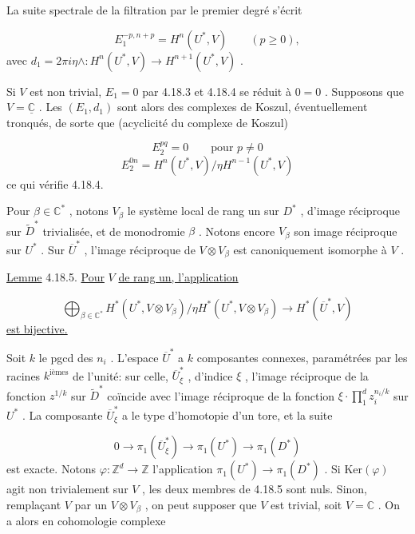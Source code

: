 La suite spectrale de la filtration par le premier degré s'écrit

\begin{equation*}
E_1^{-p,n+p} = H^n(U^*, V) \qquad (p \geqslant 0) ,
\end{equation*}
avec $d_1 = 2\pi i \eta \wedge : H^n(U^*, V) \longrightarrow H^{n+1}(U^*, V)$ .

Si $V$ est non trivial, $E_1 = 0$ par 4.18.3 et 4.18.4 se réduit à $0 = 0$ . Supposons que $V = \underline{\mathbb{C}}$ . Les $(E_1, d_1)$ sont alors des complexes de Koszul, éventuellement tronqués, de sorte que (acyclicité du complexe de Koszul)

\begin{equation*}
E_2^{pq} = 0 \qquad \text{pour } p \neq 0
\end{equation*}
\begin{equation*}
E_2^{0n} = H^n(U^*, V)/\eta H^{n-1}(U^*, V)
\end{equation*}
ce qui vérifie 4.18.4.

Pour $\beta \in \mathbb{C}^*$ , notons $V_\beta$ le système local de rang un sur $D^*$ , d'image réciproque sur $\widetilde{D}^*$ trivialisée, et de monodromie $\beta$ . Notons encore $V_\beta$ son image réciproque sur $U^*$ . Sur $\overline{U}^*$ , l'image réciproque de $V \otimes V_\beta$ est canoniquement isomorphe à $V$ .

\underline{Lemme} 4.18.5. \underline{Pour} $V$ \underline{de rang un, l'application}

\begin{equation*}
\bigoplus_{\beta \in \mathbb{C}^*} H^*(U^*, V \otimes V_\beta)/\eta H^*(U^*, V \otimes V_\beta) \longrightarrow H^*(\overline{U}^*, V)
\end{equation*}
\underline{est bijective.}

Soit $k$ le pgcd des $n_i$ . L'espace $\overline{U}^*$ a $k$ composantes connexes, paramétrées par les racines $k^{\text{ièmes}}$ de l'unité: sur celle, $\overline{U}^*_\xi$ , d'indice $\xi$ , l'image réciproque de la fonction $z^{1/k}$ sur $\widetilde{D}^*$ coïncide avec l'image réciproque de la fonction $\xi \cdot \prod_1^d z_i^{n_i/k}$ sur $U^*$ . La composante $\overline{U}^*_\xi$ a le type d'homotopie d'un tore, et la suite

\begin{equation*}
0 \longrightarrow \pi_1(\overline{U}^*_\xi) \longrightarrow \pi_1(U^*) \longrightarrow \pi_1(D^*)
\end{equation*}
est exacte. Notons $\varphi : \mathbb{Z}^d \to \mathbb{Z}$ l'application $\pi_1(U^*) \to \pi_1(D^*)$ . Si $\mathrm{Ker}(\varphi)$ agit non trivialement sur $V$ , les deux membres de 4.18.5 sont nuls. Sinon, remplaçant $V$ par un $V \otimes V_\beta$ , on peut supposer que $V$ est trivial, soit $V = \mathbb{C}$ . On a alors en cohomologie complexe

